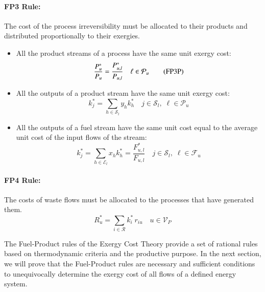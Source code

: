 \documentclass{ecos2018}
\begin{document}
\paragraph{FP3 Rule:} The cost of the process irreversibility must be allocated to their products and distributed proportionally to their exergies.
\begin{itemize}
	\item All the product streams of a process have the same unit exergy cost:
	\begin{equation}
	\label{eq:fprule3p}
	\frac{{P_u^*}}{P_u}=\frac{P_{u,l}^{*}}{P_{u,l}} \quad \ell\in\mathcal{P}_u \tag{{FP3P}}
	\end{equation}
	\item All the outputs of a product stream have the same unit exergy cost:
	\begin{equation}
	\label{eq:fprule3ps}
	k_j^*=\sum_{h\in\mathcal{S}_l}{y_h k_h^*} \quad j\in\mathcal{S}_l, \; \ell\in\mathcal{P}_u \tag{FP3PS}
	\end{equation}
	\item All the outputs of a fuel stream have the same unit cost equal to the average unit cost of the input flows of the stream:
	\begin{equation}
	\label{eq:fprule3f}
	k_j^* = \sum_{h\in\mathcal{E}_l}{x_h k_h^*} = \frac{F_{u,l}^*}{F_{u,l}} \quad j\in\mathcal{S}_l, \; \ell\in\mathcal{F}_u \tag{FP3F}
	\end{equation}
\end{itemize}
\paragraph{FP4 Rule:} The costs of waste flows must be allocated to the processes that have generated them.
\begin{equation}
\label{eq:fprule4}
R_u^*=\sum_{i\in\mathcal{R}}{k_i^* \, r_{iu}} \quad u\in\mathcal{V}_P \tag{FP4}
\end{equation}

The Fuel-Product rules of the Exergy Cost Theory provide a set of rational rules based on thermodynamic criteria and the productive purpose. In the next section, we will prove that the Fuel-Product rules are necessary and sufficient conditions to unequivocally determine the exergy cost of all flows of a defined energy system.
\end{document}
